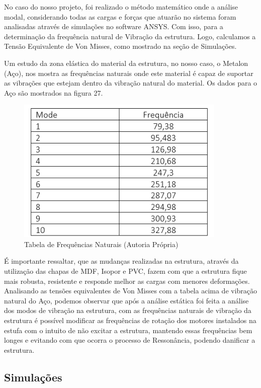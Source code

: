 No caso do nosso projeto, foi realizado o método matemático onde a análise modal, considerando todas as cargas e forças que atuarão no sistema foram analisadas através de simulações no software ANSYS. Com isso, para a determinação da frequência natural de Vibração da estrutura.  Logo, calculamos a Tensão Equivalente de Von Misses, como mostrado na seção de Simulações.

Um estudo da zona elástica do material da estrutura, no nosso caso, o Metalon (Aço), nos mostra as frequências naturais onde este material é capaz de suportar as vibrações que estejam dentro da vibração natural do material. Os dados para o Aço são mostrados na figura 27.

\begin{figure}[H]
 	\centering
 	\includegraphics[width=10cm]{figuras/tabela_frequencia.png}
 	\caption{Tabela de Frequências Naturais  (Autoria Própria)} 
 	\label{tabela_frequencia}
\end{figure}

É importante ressaltar, que as mudanças realizadas na estrutura, através da utilização das chapas de MDF, Isopor e PVC, fazem com que a estrutura fique mais robusta, resistente e responde melhor as cargas com menores deformações. Analisando as tensões equivalentes de Von Misses com a tabela acima de vibração natural do Aço, podemos observar que após a análise estática foi feita a análise dos modos de vibração na estrutura, com as frequências naturais de vibração da estrutura é possível modificar as frequências de rotação dos motores instalados na estufa com o intuito de não excitar a estrutura, mantendo essas frequências bem longes e evitando com que ocorra o processo de Ressonância, podendo danificar a estrutura. \cite{vencci2017}

\subsection{Simulações}

